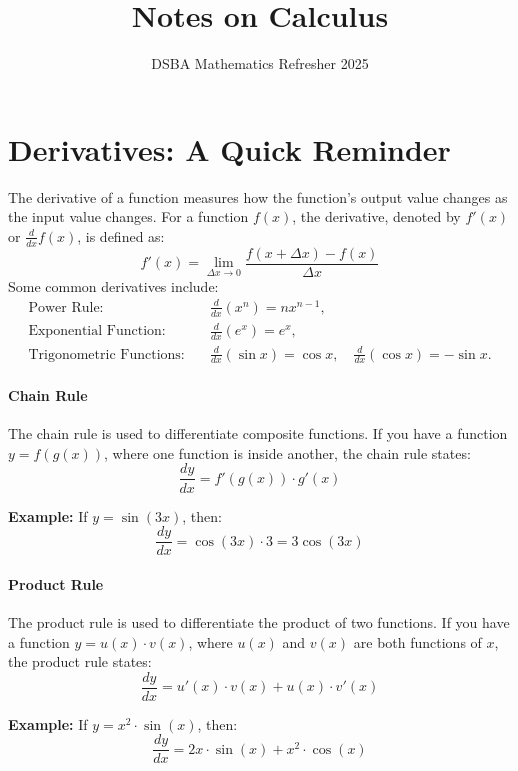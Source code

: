 \documentclass[]{article}
\title{Notes on Calculus}
\author{DSBA Mathematics Refresher 2025}
\date{}
\begin{document}
	
	\maketitle
	
	\begin{abstract}
		
	\end{abstract}
	
	
	\section{Derivatives: A Quick Reminder}
	The derivative of a function measures how the function's output value changes as the input value changes.
	For a function $f(x)$, the derivative, denoted by $f'(x)$ or $\frac{d}{dx}f(x)$, is defined as:
	$$
	f'(x) = \lim_{\Delta x \to 0} \frac{f(x+\Delta x) - f(x)}{\Delta x}
	$$
	Some common derivatives include:
	\begin{align*}
		\text{Power Rule:} & \quad \frac{d}{dx} \left( x^n \right) = nx^{n-1}, \\
		\text{Exponential Function:} & \quad \frac{d}{dx} \left( e^x \right) = e^x, \\
		\text{Trigonometric Functions:} & \quad \frac{d}{dx} \left( \sin x \right) = \cos x, \quad \frac{d}{dx} \left( \cos x \right) = -\sin x.
	\end{align*}
	
	\paragraph{Chain Rule}
	The chain rule is used to differentiate composite functions.
	 If you have a function $y = f(g(x))$, where one function is inside another, the chain rule states:
	$$
	\frac{dy}{dx} = f'(g(x)) \cdot g'(x)
	$$
	
	\noindent \textbf{Example:}
	If $y = \sin(3x)$, then:
	$$
	\frac{dy}{dx} = \cos(3x) \cdot 3 = 3\cos(3x)
	$$
	
	\paragraph{Product Rule}
	The product rule is used to differentiate the product of two functions.
	If you have a function $y = u(x) \cdot v(x)$, where $u(x)$ and $v(x)$ are both functions of $x$, the product rule states:
	$$
	\frac{dy}{dx} = u'(x) \cdot v(x) + u(x) \cdot v'(x)
	$$
	
	\noindent \textbf{Example:}
	If $y = x^2 \cdot \sin(x)$, then:
	$$
	\frac{dy}{dx} = 2x \cdot \sin(x) + x^2 \cdot \cos(x)
	$$
	
\end{document}
